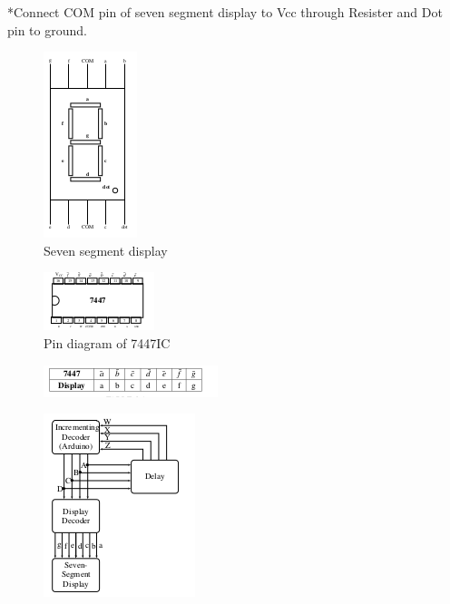 \documentclass[a4paper]{article}
\begin{document}
*Connect COM pin of seven segment display to Vcc through Resister and Dot pin to ground.
\begin{figure}
    \centering
    \includegraphics{seven.png}
    \caption{Seven segment display}
    \label{fig:my_label}
\end{figure}
\begin{figure}
    \centering
    \includegraphics{7447ic.png}
    \caption{Pin diagram of 7447IC}
    \label{fig:my_label}
\end{figure}
\begin{figure}
    \centering
    \includegraphics{sevenseg.png}
    \caption{}
    \label{fig:my_label}
\end{figure}
\begin{figure}
    \center
    \includegraphics[scale=1]{connect.jpg} 
  
    \caption{}
    \label{fig:my_label}
\end{figure}
\end{document}
